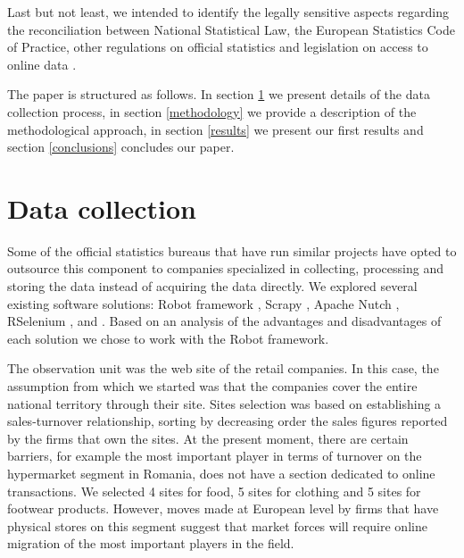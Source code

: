 \documentclass[]{article}
\begin{document}
Last but not least, we intended to identify the legally sensitive aspects regarding the reconciliation between 
National Statistical Law, the European Statistics Code of Practice, other regulations on official statistics 
and legislation on access to online data \cite{swier}.

The paper is structured as follows. In section \ref{section2} we present details of the data collection process, 
in section \ref{methodology} we provide a description of the methodological approach, in section \ref{results} we present our first results and 
section \ref{conclusions} concludes our paper.


\section{Data collection}\label{section2}

Some of the official statistics bureaus that have run similar projects have opted to outsource this component to companies specialized 
in collecting, processing and storing the data instead of acquiring the data directly. We explored several existing software solutions: 
Robot framework \cite{robot2018}, Scrapy \cite{scrapy1}, \cite{scrapy2} Apache Nutch \cite{nutch}, RSelenium \cite{rs1}, \cite{rs2} 
and \cite{rvest}. 
Based on an analysis of the advantages and disadvantages of each solution we chose to work with the Robot framework. 


The observation unit was the web site of the retail companies. In this case, the assumption from which we started was 
that the companies cover the entire national territory through their site. Sites selection was based on establishing a 
sales-turnover relationship, sorting by decreasing order the sales figures reported by the firms that own the sites. 
At the present moment, there are certain barriers, for example the most important player in terms of turnover on the 
hypermarket segment in Romania, does not have a section dedicated to online transactions. We selected 4 sites for food, 
5 sites for clothing and 5 sites for footwear products. However, moves made at European level by firms that have physical 
stores on this segment suggest that market forces will require online migration of the most important players in the field.
\end{document}
